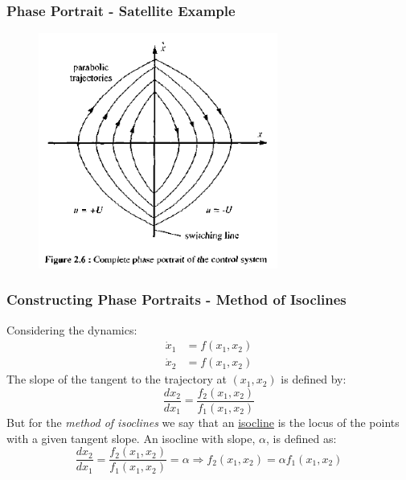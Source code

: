 \documentclass[11pt,handout]{beamer}   %
\begin{document}
\begin{frame}
\frametitle{Phase Portrait - Satellite Example}
\begin{figure}
\centering
\includegraphics[width=0.7\textwidth]{Figures/Satellite_Phase_2.PNG}
\end{figure}
\end{frame}


\begin{frame}
\frametitle{Constructing Phase Portraits - Method of Isoclines}
Considering the dynamics:
\begin{equation*}
\begin{aligned}
\dot{x}_1 &= f(x_1,x_2)\\
\dot{x}_2 &= f(x_1,x_2)
\end{aligned}
\end{equation*}
The slope of the tangent to the trajectory at $(x_1,x_2)$ is defined by:
\begin{equation*}
\frac{dx_2}{dx_1} = \frac{f_2(x_1,x_2)}{f_1(x_1,x_2)}
\end{equation*}
But for the \textit{method of isoclines} we say that an \underline{isocline} is the locus of the points with a given tangent slope. An isocline with slope, $\alpha$, is defined as:
\begin{equation*}
\frac{dx_2}{dx_1} = \frac{f_2(x_1,x_2)}{f_1(x_1,x_2)} = \alpha \Rightarrow f_2(x_1,x_2) = \alpha f_1(x_1,x_2)
\end{equation*}
\end{frame}
\end{document}
